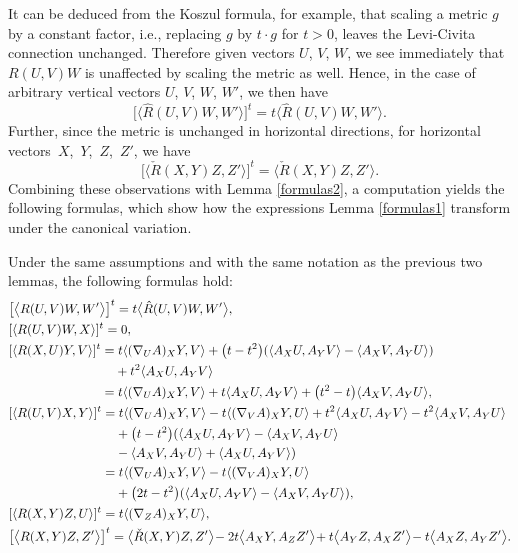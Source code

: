 It can be deduced from the Koszul formula, for example, that scaling a metric $g$ by a constant factor, i.e., replacing $g$ by $t\cdot g$ for $t>0$, leaves the Levi-Civita connection unchanged. Therefore given vectors $U$, $V$, $W$, we see immediately that $R(U,V)W$ is unaffected by scaling the metric as well. Hence, in the case of arbitrary vertical vectors $U$, $V$, $W$, $W'$, we then have
\[
\bigl[\bigl\langle\hat{R}(U,V)W,W'\bigr\rangle\bigr]^t=t\bigl\langle\hat{R}(U,V)W,W'\bigr\rangle.
\]
Further, since the metric is unchanged in horizontal directions, for horizontal vectors~$X$,~$Y$,~$Z$,~$Z'$, we have
\[
\bigl[\bigl\langle \check{R}(X,Y)Z,Z'\bigr\rangle\bigr]^t=\bigl\langle \check{R}(X,Y)Z,Z'\bigr\rangle.
\]
Combining these observations with Lemma \ref{formulas2}, a computation yields the following formulas, which show how the expressions Lemma \ref{formulas1} transform under the canonical variation.

\begin{Corollary}\label{formulas3}
	Under the same assumptions and with the same notation as the previous two lemmas, the following formulas hold:
	\begin{align*}
		&\bigl[\bigl\langle R(U,V)W,W' \bigr\rangle\bigr]^t =t\bigl\langle \hat{R}(U,V)W,W' \bigr\rangle, \\
		&[\langle R(U,V)W,X\rangle]^t =0, \\
		&[\langle R(X,U)Y,V \rangle]^t =t\langle (\nabla_U A)_X Y,V \rangle+\bigl(t-t^2\bigr)(\langle A_XU,A_YV\rangle-\langle A_XV,A_YU\rangle)\\
		&\hphantom{[\langle R(X,U)Y,V \rangle]^t =}{} +t^2\langle A_X U, A_Y V\rangle \\
		&\hphantom{[\langle R(X,U)Y,V \rangle]^t }{} =t\langle (\nabla_U A)_X Y,V \rangle +t\langle A_X U, A_Y V\rangle+\bigl(t^2-t\bigr)\langle A_XV,A_YU\rangle,\\
		&[\langle R(U,V)X,Y \rangle]^t =t\langle (\nabla_U A)_X Y,V \rangle-t\langle (\nabla_V A)_X Y,U\rangle+t^2\langle A_XU,A_YV \rangle-t^2\langle A_XV, A_YU \rangle \\
		&\hphantom{[\langle R(U,V)X,Y \rangle]^t =}{} +\bigl(t-t^2\bigr)(\langle A_XU,A_YV\rangle-\langle A_XV,A_YU\rangle\\
&\hphantom{[\langle R(U,V)X,Y \rangle]^t =}{}- \langle A_XV,A_YU\rangle + \langle A_XU,A_YV\rangle)\\
		&\hphantom{[\langle R(U,V)X,Y \rangle]^t }{} =t\langle (\nabla_U A)_X Y,V \rangle-t\langle (\nabla_V A)_X Y,U\rangle\\
		&\hphantom{[\langle R(U,V)X,Y \rangle]^t =}{} +\bigl(2t-t^2\bigr)(\langle A_XU,A_YV\rangle-\langle A_XV,A_YU\rangle),\\
		&[\langle R(X,Y)Z,U \rangle]^t = t\langle (\nabla_ZA)_X Y,U \rangle, \\
		&\bigl[\bigl\langle R(X,Y)Z,Z' \bigr\rangle\bigr]^t=\bigl\langle \check{R}(X,Y)Z,Z' \bigr\rangle\!-2t\bigl\langle A_XY,A_ZZ' \bigr\rangle\! + t\bigl\langle A_Y Z,A_X Z'\bigr\rangle\!-t\bigl\langle A_X Z, A_Y Z'\bigr\rangle.
	\end{align*}
\end{Corollary}

